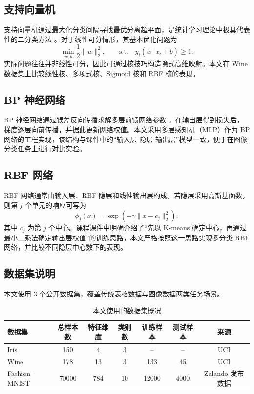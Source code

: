 \documentclass[UTF8]{ctexart}
\begin{document}
\subsection{支持向量机}
支持向量机通过最大化分类间隔寻找最优分离超平面，是统计学习理论中极具代表性的二分类方法 \cite{cortes1995svm}。对于线性可分情形，其基本优化问题为
\begin{equation}
\min_{w,b} \frac{1}{2}\|w\|_2^2,
\qquad
\text{s.t.}\quad y_i(w^\top x_i + b)\ge 1.
\end{equation}
实际问题往往并非线性可分，因此可通过核技巧构造隐式高维映射。本文在 Wine 数据集上比较线性核、多项式核、Sigmoid 核和 RBF 核的表现。

\subsection{BP 神经网络}
BP 神经网络通过误差反向传播求解多层前馈网络参数 \cite{rumelhart1986bp}。在输出层得到损失后，梯度逐层向前传播，并据此更新网络权值。本文采用多层感知机（MLP）作为 BP 网络的工程实现，该结构与课件中的“输入层-隐层-输出层”模型一致，便于在图像分类任务上进行对比实验。

\subsection{RBF 网络}
RBF 网络通常由输入层、RBF 隐层和线性输出层构成。若隐层采用高斯基函数，则第 $j$ 个单元的响应可写为 \cite{moody1989rbf}
\begin{equation}
\phi_j(x)=\exp\left(-\gamma \|x-c_j\|_2^2\right),
\end{equation}
其中 $c_j$ 为第 $j$ 个中心。课程课件中明确介绍了“先以 K-means 确定中心，再通过最小二乘法确定输出层权值”的训练思路，本文严格按照这一思路实现多分类 RBF 网络，并比较不同隐层中心数下的表现。

\subsection{数据集说明}
本文使用 3 个公开数据集，覆盖传统表格数据与图像数据两类任务场景。

\begin{table}[H]
\centering
\caption{本文使用的数据集概况}
\label{tab:dataset-summary}
\small
\begin{tabular}{lcccccc}
\toprule
数据集 & 总样本数 & 特征维度 & 类别数 & 训练样本 & 测试样本 & 来源 \\
\midrule
Iris & 150 & 4 & 3 & -- & -- & UCI \\
Wine & 178 & 13 & 3 & 133 & 45 & UCI \\
Fashion-MNIST & 70000 & 784 & 10 & 12000 & 4000 & Zalando 发布数据 \\
\bottomrule
\end{tabular}
\end{table}
\end{document}
